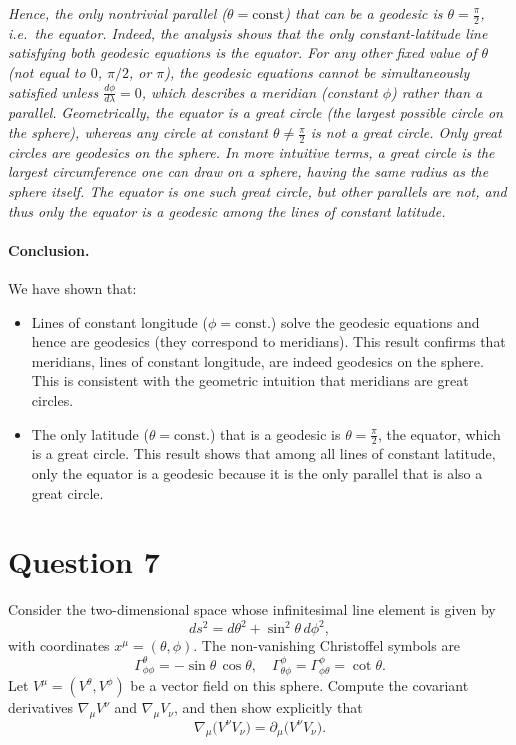 \emph{Hence, the only nontrivial parallel (\(\theta = \text{const}\)) that can be a geodesic is \(\theta = \tfrac{\pi}{2}\), i.e.\ the equator. Indeed, the analysis shows that the only constant-latitude line satisfying both geodesic equations is the equator. For any other fixed value of \(\theta\) (not equal to \(0\), \(\pi/2\), or \(\pi\)), the geodesic equations cannot be simultaneously satisfied unless \(\tfrac{d\phi}{d\lambda} = 0\), which describes a meridian (constant \(\phi\)) rather than a parallel.}
\emph{
Geometrically, the equator is a great circle (the largest possible circle on the sphere), whereas any circle at constant \(\theta \neq \tfrac{\pi}{2}\) is not a great circle. Only great circles are geodesics on the sphere. In more intuitive terms, a great circle is the largest circumference one can draw on a sphere, having the same radius as the sphere itself. The equator is one such great circle, but other parallels are not, and thus only the equator is a geodesic among the lines of constant latitude.}

\paragraph{Conclusion.}
We have shown that:
\begin{itemize}
\item Lines of constant longitude (\(\phi=\text{const.}\)) solve the geodesic equations and hence are geodesics (they correspond to meridians). This result confirms that meridians, lines of constant longitude, are indeed geodesics on the sphere. This is consistent with the geometric intuition that meridians are great circles.

\item The only latitude (\(\theta=\text{const.}\)) that is a geodesic is \(\theta=\tfrac{\pi}{2}\), the equator, which is a great circle. This result shows that among all lines of constant latitude, only the equator is a geodesic because it is the only parallel that is also a great circle.
\end{itemize}

\pagebreak

\section*{Question 7}

Consider the two-dimensional space whose infinitesimal line element is given by
\[
ds^2 = d\theta^2 + \sin^2\theta \, d\phi^2,
\]
with coordinates \(x^\mu = (\theta, \phi)\). The non-vanishing Christoffel symbols are
\[
\Gamma^\theta_{\phi\phi} = -\sin\theta\,\cos\theta,
\quad
\Gamma^\phi_{\theta\phi} = \Gamma^\phi_{\phi\theta} = \cot\theta.
\]
Let \(V^\mu = (V^\theta, V^\phi)\) be a vector field on this sphere. Compute the covariant derivatives \(\nabla_\mu V^\nu\) and \(\nabla_\mu V_\nu\), and then show explicitly that
\[
\nabla_{\mu} \bigl( V^{\nu} V_{\nu} \bigr)
=
\partial_{\mu} \bigl( V^{\nu} V_{\nu} \bigr).
\]

